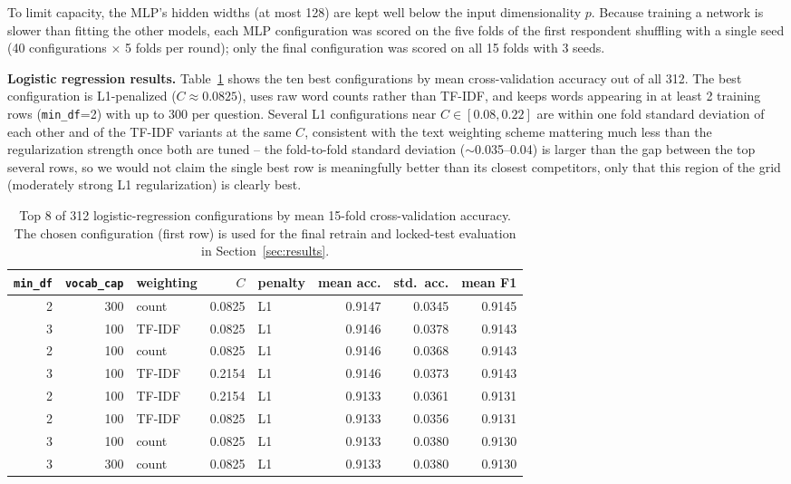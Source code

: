 \documentclass[12pt]{article}
\begin{document}
To limit capacity, the MLP's hidden widths (at most 128) are kept well below the input
dimensionality $p$. Because training a network is slower than fitting the other models, each MLP
configuration was scored on the five folds of the first respondent shuffling with a single seed
(40 configurations $\times$ 5 folds per round); only the final configuration was scored on all 15
folds with 3 seeds.

\textbf{Logistic regression results.} Table~\ref{tab:cv-results} shows the ten best configurations
by mean cross-validation accuracy out of all 312. The best configuration is L1-penalized
($C\approx0.0825$), uses raw word counts rather than TF-IDF, and keeps words appearing in at least
2 training rows (\texttt{min\_df}=2) with up to 300 per question. Several L1 configurations near
$C \in [0.08, 0.22]$ are within one fold standard deviation of each other and of the TF-IDF
variants at the same $C$, consistent with the text weighting scheme mattering much less than the
regularization strength once both are tuned -- the fold-to-fold standard deviation
($\sim$0.035--0.04) is larger than the gap between the top several rows, so we would not claim the
single best row is meaningfully better than its closest competitors, only that this region of the
grid (moderately strong L1 regularization) is clearly best.

\begin{table}[h]
\centering
\small
\begin{tabular}{@{}rrlrlrrr@{}}
\toprule
\texttt{min\_df} & \texttt{vocab\_cap} & weighting & $C$ & penalty & mean acc. & std.\ acc. &
mean F1 \\
\midrule
2 & 300 & count & 0.0825 & L1 & 0.9147 & 0.0345 & 0.9145 \\
3 & 100 & TF-IDF & 0.0825 & L1 & 0.9146 & 0.0378 & 0.9143 \\
2 & 100 & count & 0.0825 & L1 & 0.9146 & 0.0368 & 0.9143 \\
3 & 100 & TF-IDF & 0.2154 & L1 & 0.9146 & 0.0373 & 0.9143 \\
2 & 100 & TF-IDF & 0.2154 & L1 & 0.9133 & 0.0361 & 0.9131 \\
2 & 100 & TF-IDF & 0.0825 & L1 & 0.9133 & 0.0356 & 0.9131 \\
3 & 100 & count & 0.0825 & L1 & 0.9133 & 0.0380 & 0.9130 \\
3 & 300 & count & 0.0825 & L1 & 0.9133 & 0.0380 & 0.9130 \\
\bottomrule
\end{tabular}
\caption{Top 8 of 312 logistic-regression configurations by mean 15-fold cross-validation
accuracy. The chosen configuration (first row) is used for the final retrain and locked-test
evaluation in Section~\ref{sec:results}.}
\label{tab:cv-results}
\end{table}
\end{document}
